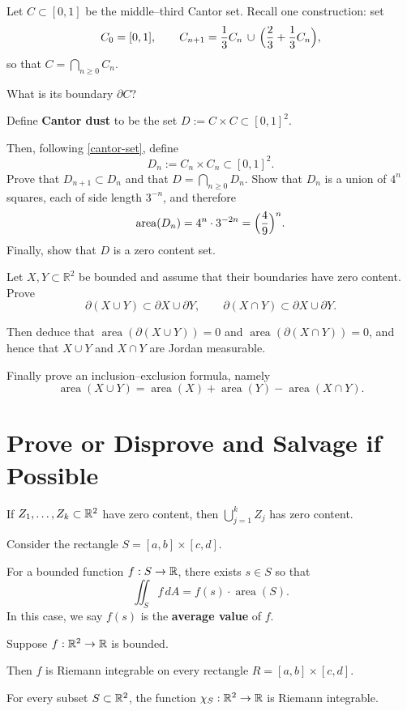 \documentclass{homework}
\newcommand{\area}{\operatorname{area}}
\begin{document}
\begin{problem}\label{cantor-set}%
Let $C\subset[0,1]$ be the middle--third Cantor set. Recall one construction: set
\[
C_0=[0,1],\qquad
C_{n+1}=\frac13 C_n \,\cup\,\Bigl(\frac23+\frac13 C_n\Bigr),
\]
so that $C=\displaystyle\bigcap_{n\ge 0} C_n$.

What is its boundary $\partial C$?
\end{problem}

\begin{problem}
Define \textbf{Cantor dust} to be the set $D := C\times C \subset [0,1]^2$.

Then, following \ref{cantor-set}, define
\[
  D_n := C_n\times C_n \subset [0,1]^2.
\]
Prove that $D_{n+1}\subset D_n$ and that $D=\displaystyle\bigcap_{n\ge 0} D_n$.
Show that $D_n$ is a union of $4^n$ squares, each of side length $3^{-n}$, and 
 therefore
  \[
  \area(D_n)=4^n\cdot 3^{-2n}=\Bigl(\frac49\Bigr)^n.
  \]
Finally, show that $D$ is a zero content set.
\end{problem}

\begin{problem}
Let $X,Y\subset\mathbb{R}^2$ be bounded and assume that their boundaries have zero content.
Prove 
\[
  \partial(X\cup Y)\subset \partial X\cup \partial Y,
  \qquad
  \partial(X\cap Y)\subset \partial X\cup \partial Y.
\]

Then deduce that $\area(\partial(X\cup Y))=0$ and $\area(\partial(X\cap Y))=0$, and hence that
$X\cup Y$ and $X\cap Y$ are Jordan measurable.

Finally prove an inclusion--exclusion formula, namely
\[
  \area(X\cup Y)=\area(X)+\area(Y)-\area(X\cap Y).
\]
\end{problem}

\section{Prove or Disprove and Salvage if Possible}

\begin{problem}\label{union-zero-content}%
  If $Z_1,\dots,Z_k\subset\mathbb{R}^2$ have zero content, then $\displaystyle\bigcup_{j=1}^k Z_j$ has zero content.
\end{problem}

\begin{problem}
  Consider the rectangle $S = [a,b] \times [c,d]$.
  
  For a bounded function $f : S \to \mathbb{R}$, there exists $s \in S$ so that
  \[
    \iint_S f\, dA = f(s) \cdot \area(S).
  \]
  In this case, we say $f(s)$ is the \textbf{average value} of $f$.
  \end{problem}

  \begin{problem}
    Suppose $f:\mathbb{R}^2\to\mathbb{R}$ is bounded.
    
  Then $f$ is Riemann integrable on every rectangle $R = [a,b] \times [c,d]$.
\end{problem}

\begin{problem}
  For every subset $S \subset \mathbb{R}^2$, the function $\chi_S : \mathbb{R}^2 \to \mathbb{R}$ is Riemann integrable.
\end{problem}
\end{document}
